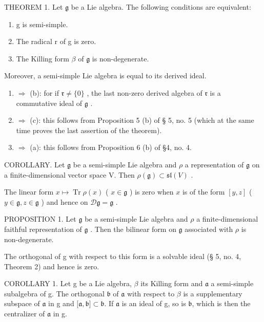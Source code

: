 THEOREM 1. Let \(\mathfrak{g}\) be a Lie algebra. The following conditions are equivalent:

\begin{enumerate}
\def\labelenumi{(\alph{enumi})}
\item
  g is semi-simple.
\item
  The radical r of g is zero.
\item
  The Killing form \(\beta\) of \(\mathfrak{g}\) is non-degenerate.
\end{enumerate}

Moreover, a semi-simple Lie algebra is equal to its derived ideal.

\begin{enumerate}
\def\labelenumi{(\alph{enumi})}
\item
  \(\Rightarrow\) (b): for if \(\mathfrak{r} \neq \{0\}\) , the last non-zero derived algebra of \(\mathfrak{r}\) is a commutative ideal of \(\mathfrak{g}\) .
\item
  \(\Rightarrow\) (c): this follows from Proposition 5 (b) of § 5, no. 5 (which at the same time proves the last assertion of the theorem).
\item
  \(\Rightarrow\) (a): this follows from Proposition 6 (b) of §4, no. 4.
\end{enumerate}

COROLLARY. Let \(\mathfrak{g}\) be a semi-simple Lie algebra and \(\rho\) a representation of \(\mathfrak{g}\) on a finite-dimensional vector space V. Then \(\rho(\mathfrak{g}) \subset \mathfrak{sl}(V)\) .

The linear form \(x \mapsto \operatorname{Tr} \rho(x)\) ( \(x \in \mathfrak{g}\) ) is zero when \(x\) is of the form \([y, z]\) ( \(y \in \mathfrak{g}, z \in \mathfrak{g}\) ) and hence on \(\mathcal{D}\mathfrak{g} = \mathfrak{g}\) .

PROPOSITION 1. Let \(\mathfrak{g}\) be a semi-simple Lie algebra and \(\rho\) a finite-dimensional faithful representation of \(\mathfrak{g}\) . Then the bilinear form on \(\mathfrak{g}\) associated with \(\rho\) is non-degenerate.

The orthogonal of g with respect to this form is a solvable ideal (§ 5, no. 4, Theorem 2) and hence is zero.

COROLLARY 1. Let g be a Lie algebra, \(\beta\) its Killing form and \(\mathfrak{a}\) a semi-simple subalgebra of g. The orthogonal \(\mathfrak{b}\) of \(\mathfrak{a}\) with respect to \(\beta\) is a supplementary subspace of \(\mathfrak{a}\) in g and \({[}\mathfrak{a}, \mathfrak{b}{]} \subset \mathfrak{b}\). If \(\mathfrak{a}\) is an ideal of g, so is \(\mathfrak{b}\), which is then the centralizer of \(\mathfrak{a}\) in g.

